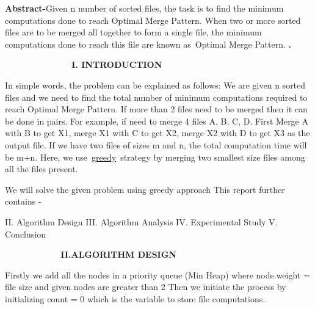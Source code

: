 \documentclass[10pt]{report}
\begin{document}
\begin{multicols}{2}

\vspace{\baselineskip}
\setlength{\parskip}{5.0pt}
{\fontsize{9pt}{10.8pt}\selectfont \textbf{Abstract-}}\textcolor[HTML]{40424E}{Given n number of sorted files, the task is to find the minimum computations done to reach Optimal Merge Pattern. When two or more sorted files are to be merged all together to form a single file, the minimum computations done to reach this file are known as Optimal Merge Pattern.}
{\fontsize{9pt}{10.8pt}\selectfont \textbf{. }}

\vspace{\baselineskip}
{\fontsize{9pt}{10.8pt}\selectfont \textbf{\ \ \ \ \ \ \ \ \ \ \ \  }}\textbf{ \  I. INTRODUCTION}

\vspace{\baselineskip}
In simple words, the problem can be explained as follows:
We are given n sorted files and we need to find the total number of minimum computations required to reach Optimal Merge Pattern.\textcolor[HTML]{40424E}{ If more than 2 files need to be merged then it can be done in pairs. For example, if need to merge 4 files A, B, C, D. First Merge A with B to get X1, merge X1 with C to get X2, merge X2 with D to get X3 as the output file.}
\setlength{\parskip}{0.0pt}
If we have two files of sizes m and n, the total computation time will be m+n. Here, we use \href{https://www.geeksforgeeks.org/greedy-algorithms/}{greedy} strategy by merging two smallest size files among all the files present.

\vspace{\baselineskip}
We will solve the given problem using greedy approach
This report further contains -

\vspace{\baselineskip}
II. Algorithm Design
III. Algorithm Analysis
IV. Experimental Study
V. Conclusion

\vspace{\baselineskip}

\vspace{\baselineskip}
\ \ \ \ \  \textbf{\ \ \ \ \ \ \  II.A}{\fontsize{9pt}{10.8pt}\selectfont \textbf{LGORITHM DESIGN}}

\vspace{\baselineskip}
\textcolor[HTML]{40424E}{Firstly we add all the nodes in a priority queue (Min Heap) where node.weight = file size and given nodes are greater than 2}
\textcolor[HTML]{40424E}{Then we initiate the process by initializing count = 0 which is the variable to store file computations.}


\end{multicols}
\end{document}
